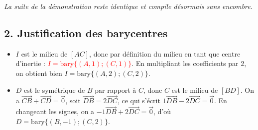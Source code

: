 \documentclass[12pt,a4paper]{article}
\begin{document}
\begin{center}
\end{center}

\textit{La suite de la démonstration reste identique et compile désormais sans encombre.}

\subsection*{2. Justification des barycentres}

\begin{itemize}
    \item $I$ est le milieu de $[AC]$, donc par définition du milieu en tant que centre d'inertie : \textcolor{red}{$I = \text{bary}\{(A, 1); (C, 1)\}$}. En multipliant les coefficients par 2, on obtient bien \textbf{$I = \text{bary}\{(A, 2); (C, 2)\}$}.
    \item $D$ est le symétrique de $B$ par rapport à $C$, donc $C$ est le milieu de $[BD]$. On a $\overrightarrow{CB} + \overrightarrow{CD} = \vec{0}$, soit $\overrightarrow{DB} = 2\overrightarrow{DC}$, ce qui s'écrit $1\overrightarrow{DB} - 2\overrightarrow{DC} = \vec{0}$. En changeant les signes, on a $-1\overrightarrow{DB} + 2\overrightarrow{DC} = \vec{0}$, d'où \textbf{$D = \text{bary}\{(B, -1); (C, 2)\}$}.
\end{itemize}
\end{document}

